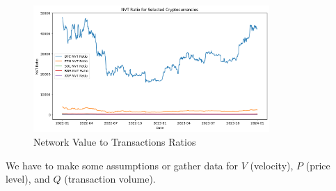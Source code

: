 \begin{figure}
    \centering
    \includegraphics[width=0.8\textwidth]{./code/valuation-techniques/nvt_ratio.png}
    \caption{Network Value to Transactions Ratios}
    \label{fig:beta}
\end{figure}

We have to make some assumptions or gather data for $V$ (velocity), $P$ (price level), and $Q$ (transaction volume).